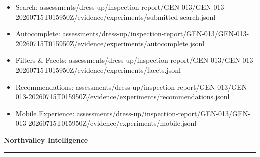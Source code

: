 \documentclass[10pt]{article}
\newcommand{\ReportFine}[1]{{\fontsize{7.6}{9.1}\selectfont\color{NVIMuted}#1}}
\begin{document}
\begin{itemize}
\item \ReportFine{Search: assessments/dress-up/inspection-report/GEN-013/GEN-013-20260715T015950Z/evidence/experiments/submitted-search.jsonl}
\item \ReportFine{Autocomplete: assessments/dress-up/inspection-report/GEN-013/GEN-013-20260715T015950Z/evidence/experiments/autocomplete.jsonl}
\item \ReportFine{Filters \& Facets: assessments/dress-up/inspection-report/GEN-013/GEN-013-20260715T015950Z/evidence/experiments/facets.jsonl}
\item \ReportFine{Recommendations: assessments/dress-up/inspection-report/GEN-013/GEN-013-20260715T015950Z/evidence/experiments/recommendations.jsonl}
\item \ReportFine{Mobile Experience: assessments/dress-up/inspection-report/GEN-013/GEN-013-20260715T015950Z/evidence/experiments/mobile.jsonl}
\end{itemize}
\vfill
\begin{center}
{\fontsize{16}{19}\selectfont\bfseries\color{NVIInk}Northvalley Intelligence}\\[0.06in]
{\color{NVIAccent}\rule{2.2in}{0.8pt}}\\[0.08in]
\ReportFine{\NorthvalleyContactLine}
\end{center}
\end{document}
